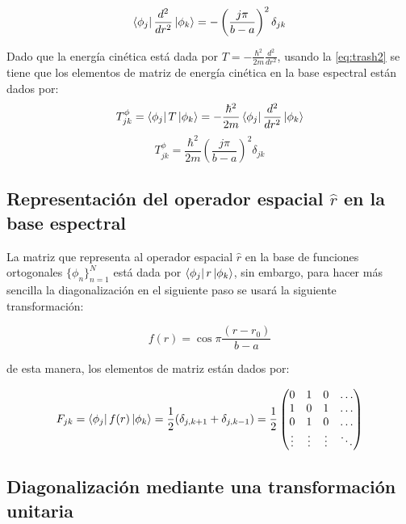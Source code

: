\begin{equation}
  \label{eq:trash2}
  \bra{\phi_j}\frac{d^2}{d r^2}\ket{\phi_k} = -\left( \frac{j\pi}{b-a} \right)^2 \delta_{jk}
\end{equation}

Dado que la energía cinética está dada por $T= -\frac{\hbar^2}{2m}\frac{d^2}{d r^2}$, usando la \autoref{eq:trash2} se tiene que los elementos de matriz de energía cinética en la base espectral están dados por:
\begin{equation}
  \label{eq:T_phi0}
  T^{\phi}_{jk} = \bra{\phi_j}T\ket{\phi_k} = -\frac{\hbar^2}{2m}\bra{\phi_j}\frac{d^2}{d r^2}\ket{\phi_k}
\end{equation}
\begin{equation}
  \label{eq:T_phi}
  T^{\phi}_{jk} = \frac{\hbar^2}{2m} \left( \frac{j\pi}{b-a} \right)^2 \delta_{jk}
\end{equation}

\subsection{Representación del operador espacial $\hat{r}$ en la base espectral}

La matriz que representa al operador espacial $\hat{r}$ en la base de funciones ortogonales $\{\phi_n \}_{n=1}^{N}$ está dada por $\bra{\phi_j}r\ket{\phi_k}$, sin embargo, para hacer más sencilla la diagonalización en el siguiente paso se usará la siguiente transformación:

\begin{equation}
  \label{eq:trash3}
  f(r) = \cos{\pi\frac{(r-r_0)}{b-a}}
\end{equation}

de esta manera, los elementos de matriz están dados por:

\begin{equation}
  \label{eq:trash4}
  F_{jk} = \bra{\phi_j}f(r)\ket{\phi_k} = \frac{1}{2}(\delta_{j,k+1}+ \delta_{j,k-1}) = \frac{1}{2}
  \begin{pmatrix}
0 & 1 & 0 & \ldots\\
1 & 0 & 1 & \ldots \\
0 & 1 & 0 & \ldots \\
\vdots & \vdots & \vdots & \ddots
\end{pmatrix}
\end{equation}

\subsection{Diagonalización mediante una transformación unitaria}

